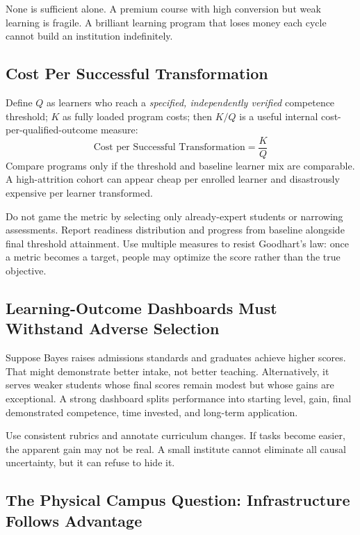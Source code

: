 None is sufficient alone. A premium course with high conversion but weak learning is fragile. A brilliant learning program that loses money each cycle cannot build an institution indefinitely.

\subsection{Cost Per Successful Transformation}
\label{sec:cost_per_successful_transformation}

Define $Q$ as learners who reach a \textit{specified, independently verified} competence threshold; $K$ as fully loaded program costs; then $K/Q$ is a useful internal cost-per-qualified-outcome measure:
\begin{equation}
\label{eq:cost_per_transformation}
\text{Cost per Successful Transformation} = \frac{K}{Q}
\end{equation}
Compare programs only if the threshold and baseline learner mix are comparable. A high-attrition cohort can appear cheap per enrolled learner and disastrously expensive per learner transformed.

Do not game the metric by selecting only already-expert students or narrowing assessments. Report readiness distribution and progress from baseline alongside final threshold attainment. Use multiple measures to resist Goodhart's law: once a metric becomes a target, people may optimize the score rather than the true objective.

\subsection{Learning-Outcome Dashboards Must Withstand Adverse Selection}
\label{sec:dashboards_withstand_adverse_selection}

Suppose Bayes raises admissions standards and graduates achieve higher scores. That might demonstrate better intake, not better teaching. Alternatively, it serves weaker students whose final scores remain modest but whose gains are exceptional. A strong dashboard splits performance into starting level, gain, final demonstrated competence, time invested, and long-term application.

Use consistent rubrics and annotate curriculum changes. If tasks become easier, the apparent gain may not be real. A small institute cannot eliminate all causal uncertainty, but it can refuse to hide it.

\subsection{The Physical Campus Question: Infrastructure Follows Advantage}
\label{sec:physical_campus_question}

